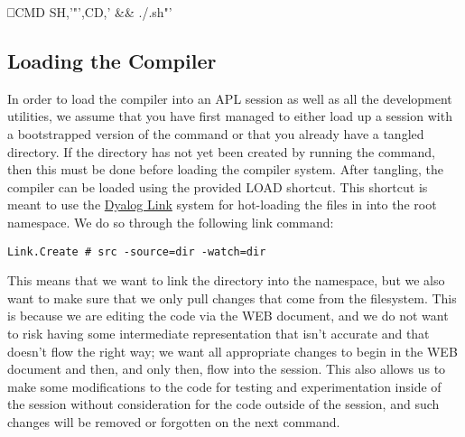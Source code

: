 \documentclass{article}%
\begin{document}
⎕CMD SH,'"',CD,' && ./.sh"'
\eatline
{}\nwendcode{}\nwdocspar
\subsection{Loading the Compiler}

In order to load the compiler into an APL session as well as all the 
development utilities, 
we assume that you have first managed to either load up a session 
with a bootstrapped version of the {\Tt{}\nwendquote} command or that you 
already have a tangled {\Tt{}\nwendquote} directory. 
If the {\Tt{}\nwendquote} directory has not yet been created by running the 
{\Tt{}\nwendquote} command, 
then this must be done before loading the compiler system.
After tangling, 
the compiler can be loaded using the provided {\Tt{}LOAD\nwendquote} shortcut.
This shortcut is meant to use the 
\href{https://github.com/Dyalog/link}{Dyalog Link}
system for hot-loading the files in {\Tt{}\nwendquote} into the root namespace.
We do so through the following link command:

\begin{verbatim}
Link.Create # src -source=dir -watch=dir
\end{verbatim}

\noindent 
This means that we want to link the {\Tt{}\nwendquote} directory into the {\Tt{}{\#}\nwendquote}
namespace,
but we also want to make sure that we only pull changes that come 
from the filesystem. 
This is because we are editing the code via the WEB document,
and we do not want to risk having some intermediate representation 
that isn't accurate and that doesn't flow the right way;
we want all appropriate changes to begin in the WEB document
and then, and only then, flow into the session.
This also allows us to make some modifications to the code for testing
and experimentation inside of the session without consideration 
for the code outside of the session,
and such changes will be removed or forgotten on the next {\Tt{}\nwendquote}
command.
\end{document}
